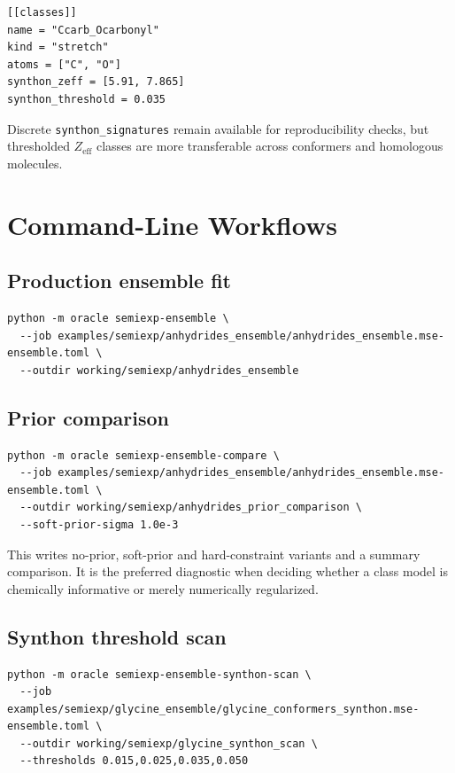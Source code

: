\documentclass[11pt]{article}
\newcommand{\zeff}{Z_\mathrm{eff}}
\begin{document}
\begin{lstlisting}[style=oracle]
[[classes]]
name = "Ccarb_Ocarbonyl"
kind = "stretch"
atoms = ["C", "O"]
synthon_zeff = [5.91, 7.865]
synthon_threshold = 0.035
\end{lstlisting}

\noindent
Discrete \texttt{synthon\_signatures} remain available for reproducibility
checks, but thresholded \(\zeff\) classes are more transferable across
conformers and homologous molecules.

\section{Command-Line Workflows}

\subsection{Production ensemble fit}

\begin{lstlisting}[style=oracle]
python -m oracle semiexp-ensemble \
  --job examples/semiexp/anhydrides_ensemble/anhydrides_ensemble.mse-ensemble.toml \
  --outdir working/semiexp/anhydrides_ensemble
\end{lstlisting}

\subsection{Prior comparison}

\begin{lstlisting}[style=oracle]
python -m oracle semiexp-ensemble-compare \
  --job examples/semiexp/anhydrides_ensemble/anhydrides_ensemble.mse-ensemble.toml \
  --outdir working/semiexp/anhydrides_prior_comparison \
  --soft-prior-sigma 1.0e-3
\end{lstlisting}

\noindent
This writes no-prior, soft-prior and hard-constraint variants and a summary
comparison.  It is the preferred diagnostic when deciding whether a class model
is chemically informative or merely numerically regularized.

\subsection{Synthon threshold scan}

\begin{lstlisting}[style=oracle]
python -m oracle semiexp-ensemble-synthon-scan \
  --job examples/semiexp/glycine_ensemble/glycine_conformers_synthon.mse-ensemble.toml \
  --outdir working/semiexp/glycine_synthon_scan \
  --thresholds 0.015,0.025,0.035,0.050
\end{lstlisting}
\end{document}
